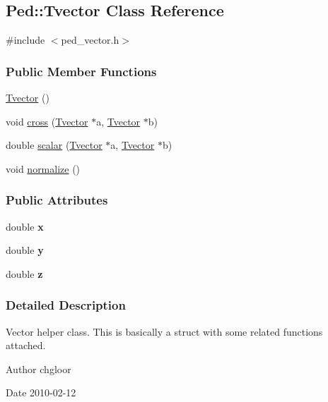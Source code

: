 \hypertarget{classPed_1_1Tvector}{
\subsection{Ped::Tvector Class Reference}
\label{classPed_1_1Tvector}
}


{\ttfamily \#include $<$ped\_\-vector.h$>$}

\subsubsection*{Public Member Functions}
\begin{DoxyCompactItemize}
\item 
\hyperlink{classPed_1_1Tvector_aa02ef092df574ad31a20ebf4a0b229b3}{Tvector} ()
\item 
void \hyperlink{classPed_1_1Tvector_a37c7cf44762a031fa800695cae60613a}{cross} (\hyperlink{classPed_1_1Tvector}{Tvector} $\ast$a, \hyperlink{classPed_1_1Tvector}{Tvector} $\ast$b)
\item 
double \hyperlink{classPed_1_1Tvector_a77b066e39fae7ad784d24d08be94b31c}{scalar} (\hyperlink{classPed_1_1Tvector}{Tvector} $\ast$a, \hyperlink{classPed_1_1Tvector}{Tvector} $\ast$b)
\item 
void \hyperlink{classPed_1_1Tvector_a1599095e978b9bd8cbab69b2b04ed027}{normalize} ()
\end{DoxyCompactItemize}
\subsubsection*{Public Attributes}
\begin{DoxyCompactItemize}
\item 
\hypertarget{classPed_1_1Tvector_a044393d1b7bce39be634b78a45afa0ba}{
double {\bfseries x}}
\label{classPed_1_1Tvector_a044393d1b7bce39be634b78a45afa0ba}

\item 
\hypertarget{classPed_1_1Tvector_ad36c1fd9f63e13ed41f7e7da0d5f1b92}{
double {\bfseries y}}
\label{classPed_1_1Tvector_ad36c1fd9f63e13ed41f7e7da0d5f1b92}

\item 
\hypertarget{classPed_1_1Tvector_a1a3c39b01c440d52745f75670547eb29}{
double {\bfseries z}}
\label{classPed_1_1Tvector_a1a3c39b01c440d52745f75670547eb29}

\end{DoxyCompactItemize}


\subsubsection{Detailed Description}
Vector helper class. This is basically a struct with some related functions attached. \begin{DoxyAuthor}{Author}
chgloor 
\end{DoxyAuthor}
\begin{DoxyDate}{Date}
2010-\/02-\/12 
\end{DoxyDate}


